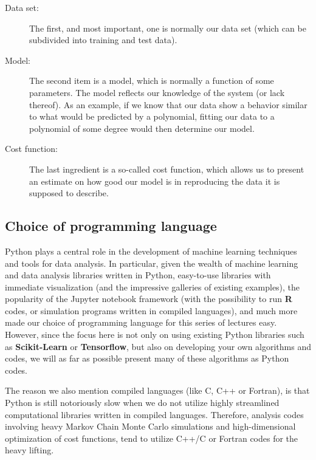 \documentclass[%
oneside,                 %
final,                   %
10pt]{article}
\begin{document}
\begin{description}
\item[Data set:] 
  The first, and most important, one is normally our data set (which can be subdivided into training and test data). 

\item[Model:] 
  The second item is a model, which is normally a function of some parameters. The model reflects our knowledge of the system (or lack thereof). As an example, if we know that our data show a behavior similar to what would be predicted by a polynomial, fitting our data to a polynomial of some degree would then determine our model. 

\item[Cost function:] 
  The last ingredient is a so-called cost function, which allows us to present an estimate on how good our model is in reproducing the data it is supposed to describe.  
\end{description}

\noindent
\subsection{Choice of programming language}

Python plays a central role in the development of machine
learning techniques and tools for data analysis. In particular, given
the wealth of machine learning and data analysis libraries written in
Python, easy-to-use libraries with immediate visualization (and the
impressive galleries of existing examples), the popularity of the
Jupyter notebook framework (with the possibility to run \textbf{R} codes, or
simulation programs written in compiled languages), and much more made our choice of
programming language for this series of lectures easy. However,
since the focus here is not only on using existing Python libraries such
as \textbf{Scikit-Learn} or \textbf{Tensorflow}, but also on developing your own
algorithms and codes, we will as far as possible present many of these
algorithms as Python codes. 

The reason we also  mention compiled languages (like C, C++ or
Fortran), is that Python is still notoriously slow when we do not
utilize highly streamlined computational libraries 
written in compiled languages.  Therefore, analysis codes involving heavy Markov Chain Monte Carlo simulations and high-dimensional optimization of cost functions, tend to utilize C++/C or Fortran codes for the heavy lifting.
\end{document}
